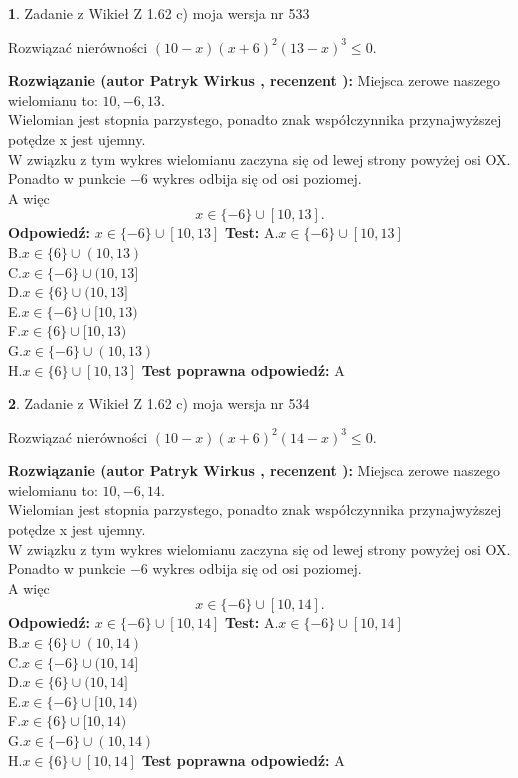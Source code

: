 \documentclass[12pt, a4paper]{article}
\theoremstyle{definition} %
\newtheorem{zad}{}
\newcommand{\zadStart}[1]{\begin{zad}#1\newline}
\newcommand{\zadStop}{\end{zad}}
\newcommand{\rozwStart}[2]{\noindent \textbf{Rozwiązanie (autor #1 , recenzent #2): }\newline}
\newcommand{\rozwStop}{\newline}
\newcommand{\odpStart}{\noindent \textbf{Odpowiedź:}\newline}
\newcommand{\odpStop}{\newline}
\newcommand{\testStart}{\noindent \textbf{Test:}\newline}
\newcommand{\testStop}{\newline}
\newcommand{\kluczStart}{\noindent \textbf{Test poprawna odpowiedź:}\newline}
\newcommand{\kluczStop}{\newline}
\begin{document}
\zadStart{Zadanie z Wikieł Z 1.62 c) moja wersja nr 533}

Rozwiązać nierówności $(10-x)(x+6)^{2}(13-x)^{3}\le0$.
\zadStop
\rozwStart{Patryk Wirkus}{}
Miejsca zerowe naszego wielomianu to: $10, -6, 13$.\\
Wielomian jest stopnia parzystego, ponadto znak współczynnika przy\linebreak najwyższej potędze x jest ujemny.\\ W związku z tym wykres wielomianu zaczyna się od lewej strony powyżej osi OX.\\
Ponadto w punkcie $-6$ wykres odbija się od osi poziomej.\\
A więc $$x \in \{-6\} \cup [10,13].$$
\rozwStop
\odpStart
$x \in \{-6\} \cup [10,13]$
\odpStop
\testStart
A.$x \in \{-6\} \cup [10,13]$\\
B.$x \in \{6\} \cup (10,13)$\\
C.$x \in \{-6\} \cup (10,13]$\\
D.$x \in \{6\} \cup (10,13]$\\
E.$x \in \{-6\} \cup [10,13)$\\
F.$x \in \{6\} \cup [10,13)$\\
G.$x \in \{-6\} \cup (10,13)$\\
H.$x \in \{6\} \cup [10,13]$
\testStop
\kluczStart
A
\kluczStop



\zadStart{Zadanie z Wikieł Z 1.62 c) moja wersja nr 534}

Rozwiązać nierówności $(10-x)(x+6)^{2}(14-x)^{3}\le0$.
\zadStop
\rozwStart{Patryk Wirkus}{}
Miejsca zerowe naszego wielomianu to: $10, -6, 14$.\\
Wielomian jest stopnia parzystego, ponadto znak współczynnika przy\linebreak najwyższej potędze x jest ujemny.\\ W związku z tym wykres wielomianu zaczyna się od lewej strony powyżej osi OX.\\
Ponadto w punkcie $-6$ wykres odbija się od osi poziomej.\\
A więc $$x \in \{-6\} \cup [10,14].$$
\rozwStop
\odpStart
$x \in \{-6\} \cup [10,14]$
\odpStop
\testStart
A.$x \in \{-6\} \cup [10,14]$\\
B.$x \in \{6\} \cup (10,14)$\\
C.$x \in \{-6\} \cup (10,14]$\\
D.$x \in \{6\} \cup (10,14]$\\
E.$x \in \{-6\} \cup [10,14)$\\
F.$x \in \{6\} \cup [10,14)$\\
G.$x \in \{-6\} \cup (10,14)$\\
H.$x \in \{6\} \cup [10,14]$
\testStop
\kluczStart
A
\kluczStop
\end{document}
